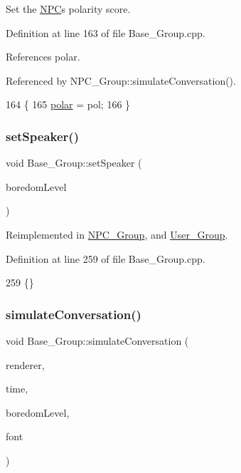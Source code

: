 Set the \hyperlink{class_n_p_c}{N\+PC}\textquotesingle{}s polarity score. 



Definition at line 163 of file Base\+\_\+\+Group.\+cpp.



References polar.



Referenced by N\+P\+C\+\_\+\+Group\+::simulate\+Conversation().


\begin{DoxyCode}
164 \{
165     \hyperlink{class_base___group_a0c2dfa52ac107ec9564bfc42917e8ce0}{polar} = pol;
166 \}
\end{DoxyCode}
\mbox{\label{class_base___group_ae35b3719076cf40d6577b4ae3779758c}} 
\subsubsection{\texorpdfstring{set\+Speaker()}{setSpeaker()}}
{\footnotesize\ttfamily void Base\+\_\+\+Group\+::set\+Speaker (\begin{DoxyParamCaption}\item[{std\+::string}]{boredom\+Level }\end{DoxyParamCaption})\hspace{0.3cm}{\ttfamily [virtual]}}



Reimplemented in \hyperlink{class_n_p_c___group_a5c1f3d1ad1f50910bb912ed828615ff8}{N\+P\+C\+\_\+\+Group}, and \hyperlink{class_user___group_aeb67757a4645ae32ea0b9c426fece2de}{User\+\_\+\+Group}.



Definition at line 259 of file Base\+\_\+\+Group.\+cpp.


\begin{DoxyCode}
259 \{\}
\end{DoxyCode}
\mbox{\label{class_base___group_aa5080b6388c5974394bf326ce80bfa91}} 
\subsubsection{\texorpdfstring{simulate\+Conversation()}{simulateConversation()}}
{\footnotesize\ttfamily void Base\+\_\+\+Group\+::simulate\+Conversation (\begin{DoxyParamCaption}\item[{S\+D\+L\+\_\+\+Renderer $\ast$}]{renderer,  }\item[{bool}]{time,  }\item[{std\+::string}]{boredom\+Level,  }\item[{T\+T\+F\+\_\+\+Font $\ast$}]{font }\end{DoxyParamCaption})\hspace{0.3cm}{\ttfamily [virtual]}}



